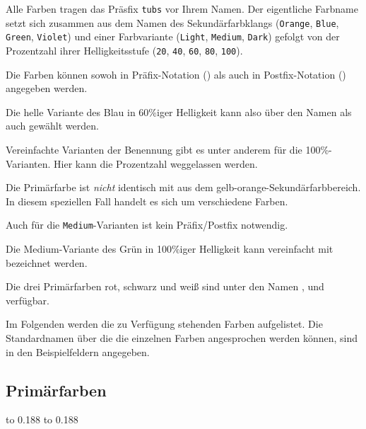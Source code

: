 Alle Farben tragen das Präsfix \texttt{tubs} vor Ihrem Namen.
Der eigentliche Farbname setzt sich zusammen aus dem Namen
des Sekundärfarbklangs
(\texttt{Orange}, \texttt{Blue}, \texttt{Green}, \texttt{Violet}) 
und einer Farbvariante
(\texttt{Light}, \texttt{Medium}, \texttt{Dark})
gefolgt von der Prozentzahl ihrer Helligkeitsstufe
(\texttt{20}, \texttt{40}, \texttt{60}, \texttt{80}, \texttt{100}).

Die Farben können sowoh in Präfix-Notation
()
als auch in Postfix-Notation ()
angegeben werden.

\begin{example}
  Die helle Variante des Blau in 60\%iger Helligkeit kann also
  über den Namen  als auch
   gewählt werden.
\end{example}

Vereinfachte Varianten der Benennung gibt es unter anderem für die 100\%-Varianten.
Hier kann die Prozentzahl weggelassen werden.
\begin{important}
Die Primärfarbe  ist \emph{nicht} identisch mit 
aus dem gelb-orange-Sekundärfarbbereich.
In diesem speziellen Fall handelt es sich um verschiedene Farben.
\end{important}
Auch für die \texttt{Medium}-Varianten ist kein Präfix/Postfix notwendig.
\begin{example}
  Die Medium-Variante des Grün in 100\%iger Helligkeit kann vereinfacht
  mit  bezeichnet werden.
\end{example}

Die drei Primärfarben rot, schwarz und weiß sind unter den Namen
,  und  verfügbar.

Im Folgenden werden die zu Verfügung stehenden Farben aufgelistet.
Die Standardnamen über die die einzelnen Farben angesprochen werden können,
sind in den Beispielfeldern angegeben.

\subsection{Primärfarben}

{\sffamily\footnotesize%
\colorbox{tubsRed}{\hbox to 0.188}%
\colorbox{tubsBlack}{\hbox to 0.188}%
\\%
}

